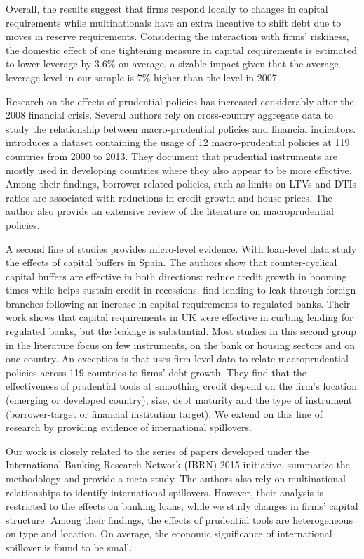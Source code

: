 \documentclass[12pt]{article}
\begin{document}
	Overall, the results suggest that firms respond locally to changes in capital requirements while multinationals have an extra incentive to shift debt due to moves in reserve requirements. Considering the interaction with firms' riskiness, the domestic effect of one tightening measure in capital requirements is estimated to lower leverage by 3.6\% on average, a sizable impact given that the average leverage level in our sample is 7\% higher than the level in 2007.
	
	Research on the effects of prudential policies has increased considerably after the 2008 financial crisis. Several authors rely on cross-country aggregate data to study the relationship between macro-prudential policies and financial indicators. \cite*{cerutti2015use} introduces a dataset containing the usage of 12 macro-prudential policies at 119 countries from 2000 to 2013. They document that prudential instruments are mostly used in developing countries where they also appear to be more effective. Among their findings, borrower-related policies, such as limits on LTVs and DTIs ratios are associated with reductions in credit growth and house prices. The author also provide an extensive review of the literature on macroprudential policies. 
	
	A second line of studies provides micro-level evidence. With loan-level data \cite*{jimenez2012macroprudential} study the  effects of capital buffers in Spain. The authors show that counter-cyclical capital buffers are effective in both directions: reduce credit growth in booming times while helps sustain credit in recessions. \cite*{aiyar2014does} find lending to leak through foreign branches following an increase in capital requirements to regulated banks. Their work shows that capital requirements in UK were effective in curbing lending for regulated banks, but the leakage is substantial. Most studies in this second group in the literature focus on few instruments, on the bank or housing sectors and on one country. An exception is \cite*{ayyagari2017credit} that uses firm-level data to relate macroprudential policies across 119 countries to firms' debt growth. They find that the effectiveness of prudential tools at smoothing credit depend on the firm's location (emerging or developed country), size, debt maturity and the type of instrument (borrower-target or financial institution target). We extend on this line of research by providing evidence of international spillovers.
	
	Our work is closely related to the series of papers developed under the International Banking Research Network (IBRN) 2015 initiative. \cite*{buch2017cross} summarize the methodology and provide a meta-study. The authors also rely on multinational relationships to identify international spillovers. However, their analysis is restricted to the effects on banking loans, while we study changes in firms' capital structure. Among their findings, the effects of prudential tools are heterogeneous on type and location. On average, the economic significance of international spillover is found to be small.  
	
\end{document}

